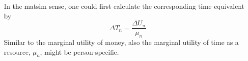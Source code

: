 In the \acrshort{matsim} sense, one could first calculate the corresponding time equivalent 
%
by
%
\begin{equation}
\label{eq:ch:economicEval:monetizationTime}
\Delta T_n = \frac{\Delta U_n}{\mu_n}
\end{equation}
%
Similar to the marginal utility of money, also the marginal utility of time as a resource, $\mu_n$, might be person-specific.
%

